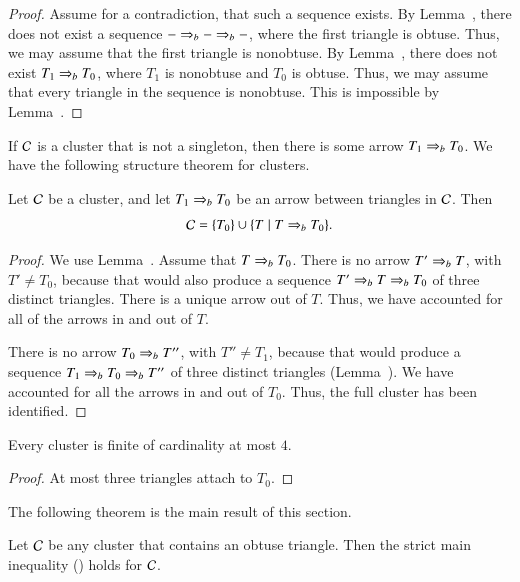 \begin{proof}  
  Assume for a contradiction, that such a sequence exists.  By
  Lemma~, there does not exist a sequence $- \Rightarrow_{b} -
  \Rightarrow_{b} -$, where the first triangle is obtuse.  Thus, we may assume
  that the first triangle is nonobtuse.  By Lemma~,
  there does not exist $T_1\Rightarrow_{b} T_0$, where $T_1$ is nonobtuse and
  $T_0$ is obtuse.  Thus, we may assume that every triangle in the
  sequence is nonobtuse.  This is impossible by
  Lemma~.
\end{proof}

If $\mathcal C$ is a cluster that is not a singleton, then there is
some arrow $T_1\Rightarrow_{b} T_0$.  We have the following structure
theorem for clusters.

\begin{theorem}
  Let $\mathcal C$ be a cluster, and let $T_1\Rightarrow_{b} T_0$ be an
  arrow between triangles in $\mathcal C$.
  Then 
  \begin{equation}\libel{eqn:c-weak}
  \C = \{T_0\}\cup \{T \mid T\rab T_0\}.
  \end{equation}
\end{theorem}

\begin{proof}  
  We use Lemma~.  Assume that $T\Rightarrow_{b} T_0$.  There
  is no arrow $T'\Rightarrow_{b} T$, with $T'\ne T_0$, because that would also
  produce a sequence $T' \Rightarrow_{b} T \Rightarrow_{b} T_0$ of three distinct triangles.
  There is a unique arrow out of $T$.  Thus, we have accounted for all
  of the arrows in and out of $T$.

  There is no arrow $T_0\Rightarrow_{b} T''$, with $T''\ne T_1$, because that
  would produce a sequence $T_1\Rightarrow_{b} T_0\Rightarrow_{b} T''$ of  three 
  distinct triangles (Lemma~).  We have accounted for all the arrows in and
  out of $T_0$.  Thus, the full cluster has been identified.
\end{proof}

\begin{corollary}
  Every cluster is finite of cardinality at most $4$.
\end{corollary}

\begin{proof} At most three triangles attach to $T_0$.
\end{proof}

The following theorem is the main result of this
section.

\begin{theorem}  
  Let $\mathcal C$ be any cluster that contains an obtuse triangle.  Then 
   the strict main inequality ()
  holds for $\mathcal C$.
\end{theorem}

